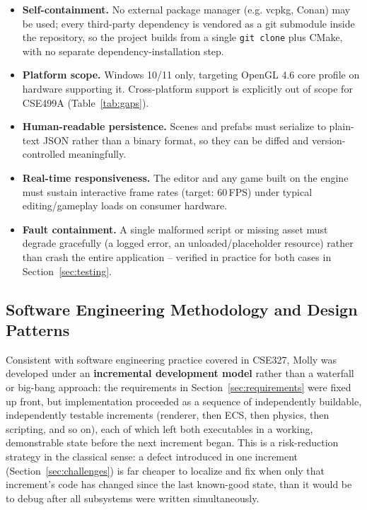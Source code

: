 \documentclass[conference]{IEEEtran}
\begin{document}
\begin{itemize}
    \item \textbf{Self-containment.} No external package manager
          (e.g. vcpkg, Conan) may be used; every third-party dependency
          is vendored as a git submodule inside the repository, so the
          project builds from a single \texttt{git clone} plus CMake,
          with no separate dependency-installation step.
    \item \textbf{Platform scope.} Windows 10/11 only, targeting OpenGL
          4.6 core profile on hardware supporting it. Cross-platform
          support is explicitly out of scope for CSE499A (Table~\ref{tab:gaps}).
    \item \textbf{Human-readable persistence.} Scenes and prefabs must
          serialize to plain-text JSON rather than a binary format, so
          they can be diffed and version-controlled meaningfully.
    \item \textbf{Real-time responsiveness.} The editor and any game
          built on the engine must sustain interactive frame rates
          (target: 60\,FPS) under typical editing/gameplay loads on
          consumer hardware.
    \item \textbf{Fault containment.} A single malformed script or
          missing asset must degrade gracefully (a logged error, an
          unloaded/placeholder resource) rather than crash the entire
          application -- verified in practice for both cases in
          Section~\ref{sec:testing}.
\end{itemize}

\subsection{Software Engineering Methodology and Design Patterns}
\label{sec:se}

Consistent with software engineering practice covered in CSE327, Molly
was developed under an \textbf{incremental development model} rather
than a waterfall or big-bang approach: the requirements in
Section~\ref{sec:requirements} were fixed up front, but implementation
proceeded as a sequence of independently buildable, independently
testable increments (renderer, then ECS, then physics, then scripting,
and so on), each of which left both executables in a working,
demonstrable state before the next increment began. This is a
risk-reduction strategy in the classical sense: a defect introduced in
one increment (Section~\ref{sec:challenges}) is far cheaper to localize
and fix when only that increment's code has changed since the last known-good
state, than it would be to debug after all subsystems were written
simultaneously.
\end{document}
